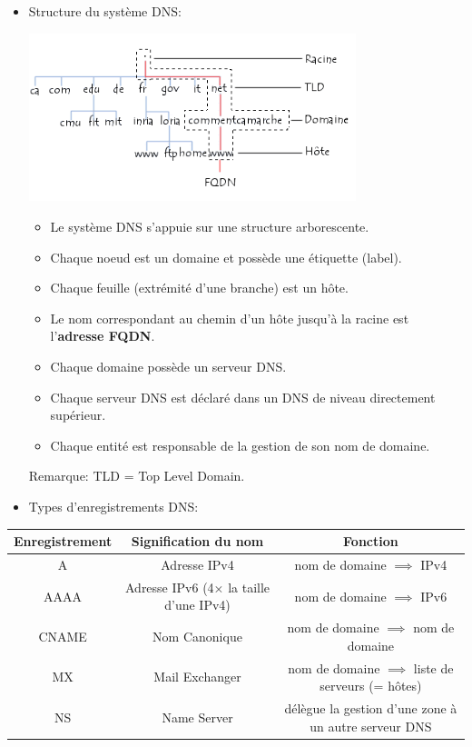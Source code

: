 \documentclass[a4paper]{article}
\begin{document}
\begin{itemize}
\item Structure du système DNS:
\begin{center}
\includegraphics[width=0.75\textwidth]{images/internet-images-dnsarb.png}
\end{center}
\begin{itemize}
    \item Le système DNS s'appuie sur une structure arborescente.
    \item Chaque noeud est un domaine et possède une étiquette (label).
    \item Chaque feuille (extrémité d'une branche) est un hôte.
    \item Le nom correspondant au chemin d'un hôte jusqu'à la racine est l'\textbf{adresse FQDN}.
    \item Chaque domaine possède un serveur DNS.
    \item Chaque serveur DNS est déclaré dans un DNS de niveau directement supérieur.
    \item Chaque entité est responsable de la gestion de son nom de domaine.
\end{itemize}
Remarque: TLD = Top Level Domain.





\item Types d'enregistrements DNS:





\end{itemize}





\begin{center}
\begin{tabular}{|c|c|c|} \hline
Enregistrement & Signification du nom & Fonction \\ \hline
A & Adresse IPv4 & nom de domaine $ \implies $ IPv4 \\
AAAA & Adresse IPv6 (4$\times$ la taille d'une IPv4) & nom de domaine $ \implies $ IPv6 \\
CNAME & Nom Canonique & nom de domaine $ \implies $ nom de domaine \\
MX & Mail Exchanger & nom de domaine $ \implies $ liste de serveurs (= hôtes) \\
NS & Name Server & délègue la gestion d'une zone à un autre serveur DNS \\ \hline
\end{tabular}
\end{center}
\end{document}
